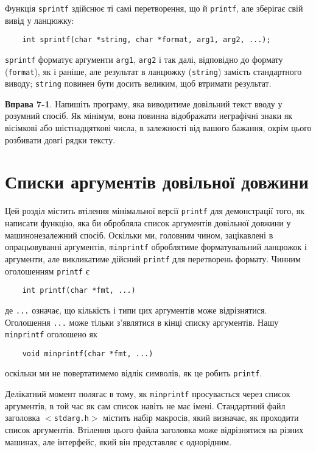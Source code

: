 \documentclass[a4paper,12pt]{book}
\begin{document}
  Функція \texttt{sprintf} здійснює ті самі перетворення, що й \texttt{printf}, але
  зберігає свій вивід у ланцюжку:
  \begin{verbatim}
    int sprintf(char *string, char *format, arg1, arg2, ...);
  \end{verbatim}

  \texttt{sprintf} форматує аргументи \texttt{arg1}, \texttt{arg2} і так далі, відповідно
  до формату (\texttt{format}), як і раніше, але результат в ланцюжку (\texttt{string})
  замість стандартного виводу; \texttt{string} повинен бути досить великим, щоб втримати
  результат.

  \textbf{Вправа 7-1}. Напишіть програму, яка виводитиме довільний текст вводу у розумний
  спосіб. Як мінімум, вона повинна відображати неграфічні знаки як вісімкові або
  шістнадцяткові числа, в залежності від вашого бажання, окрім цього розбивати довгі
  рядки тексту.

\section{Списки аргументів довільної довжини}


  Цей розділ містить втілення мінімальної версії \texttt{printf} для демонстрації того, як
  написати функцію, яка би обробляла список аргументів довільної довжини у
  машинонезалежний спосіб. Оскільки ми, головним чином, зацікавлені в опрацьовуванні
  аргументів, \texttt{minprintf} оброблятиме форматувальний ланцюжок і аргументи, але
  викликатиме дійсний \texttt{printf} для перетворень формату. Чинним оголошенням
  \texttt{printf} є
  \begin{verbatim}
    int printf(char *fmt, ...)
  \end{verbatim}

  де \texttt{...} означає, що кількість і типи цих аргументів може відрізнятися.
  Оголошення \texttt{...} може тільки з'являтися в кінці списку аргументів. Нашу
  \texttt{minprintf} оголошено як
  \begin{verbatim}
    void minprintf(char *fmt, ...)
  \end{verbatim}
  оскільки ми не повертатимемо відлік символів, як це робить \texttt{printf}.

  Делікатний момент полягає в тому, як \texttt{minprintf} просувається через список
  аргументів, в той час як сам список навіть не має імені. Стандартний файл заголовка
  \texttt{\mbox{$<$}stdarg.h\mbox{$>$}} містить набір макросів, який визначає, як
  проходити список аргументів. Втілення цього файла заголовка може відрізнятися на різних
  машинах, але інтерфейс, який він представляє є однорідним.
\end{document}
